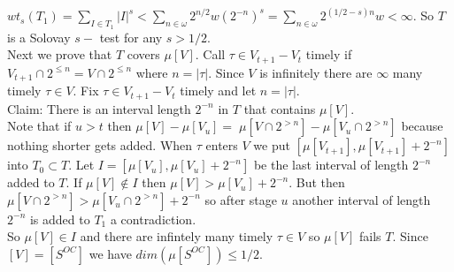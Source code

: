 \documentclass{article}
\begin{document}
   $wt_s(T_1) = \sum_{I\in T_1} |I|^s < \sum_{n \in \omega} 2^{n/2} w(2^{-n})^s = \sum_{n\in \omega} 2^{(1/2-s)n}w < \infty$. So $T$ is a Solovay $s-$ test for any $s> 1/2$.\\
   Next we prove that $T$ covers $\mu[V]$. Call $\tau \in V_{t+1} - V_t$ timely if $V_{t+1} \cap 2^{\leq n} = V\cap 2^{\leq n}$ where $n = |\tau|$. Since $V$ is infinitely there are $\infty$ many timely $\tau \in V$. Fix $\tau \in V_{t+1} - V_t$ timely and let $n = |\tau|$. \\
   Claim: There is an interval length $2^{-n}$ in $T$ that contains $\mu [V]$. 
   \\ Note that if $u > t$ then $\mu [V] - \mu [V_u] =\; \mu [ V\cap 2^{>n}] - \mu [V_u \cap 2^{>n}]$ because nothing shorter gets added. When $\tau$ enters $V$ we put $[\mu[V_{t+1}], \mu[V_{t+1}]+2^{-n}]$ into $T_0 \subset T$. Let $I = [\mu [V_u],\mu[V_u]+2^{-n}]$ be the last interval of length $2^{-n} $ added to $T$. If $\mu[V] \not \in I$ then $\mu[V] > \mu[V_u] + 2^{-n}$. But then $\mu[V \cap 2^{>n}]> \mu[V_u \cap 2^{>n}]+ 2^{-n}$ so after stage $u$ another interval of length $2^{-n}$ is added to $T_1 $ a contradiction.\\
   So $\mu[V] \in I$ and there are infintely many timely $\tau \in V$ so $\mu[V]$ fails $T$. Since $[V] = [S^{OC}]$ we have $dim(\mu[S^{OC}]) \leq 1/2$.
   \newpage
\end{document}
